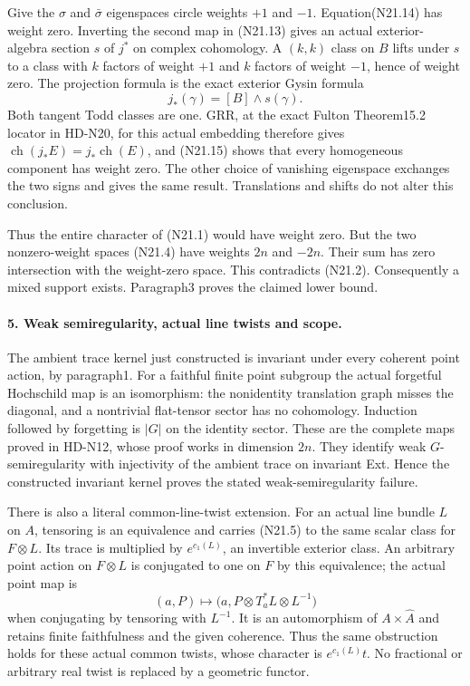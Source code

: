 Give the $\sigma$ and $\bar\sigma$ eigenspaces circle weights
$+1$ and $-1$. Equation(N21.14) has weight zero. Inverting
the second map in (N21.13) gives an actual exterior-algebra
section $s$ of $j^*$ on complex cohomology. A $(k,k)$ class
on $B$ lifts under $s$ to a class with $k$ factors of weight
$+1$ and $k$ factors of weight $-1$, hence of weight zero.
The projection formula is the exact exterior Gysin formula
\[
                  j_*(\gamma)=[B]\wedge s(\gamma).
                                                               \tag{N21.15}
\]
Both tangent Todd classes are one. GRR, at the exact Fulton
Theorem15.2 locator in HD-N20, for this actual
embedding therefore gives
$\operatorname{ch}(j_*E)=j_*\operatorname{ch}(E)$, and
(N21.15) shows that every homogeneous component has
weight zero. The other choice of vanishing eigenspace
exchanges the two signs and gives the same result.
Translations and shifts do not alter this conclusion.

Thus the entire character of (N21.1) would have weight
zero. But the two nonzero-weight spaces (N21.4) have
weights $2n$ and $-2n$. Their sum has zero intersection
with the weight-zero space. This contradicts (N21.2).
Consequently a mixed support exists. Paragraph3 proves
the claimed lower bound.

\paragraph{5. Weak semiregularity, actual line twists and scope.}
The ambient trace kernel just constructed is invariant
under every coherent point action, by paragraph1. For a
faithful finite point subgroup the actual forgetful
Hochschild map is an isomorphism: the nonidentity
translation graph misses the diagonal, and a nontrivial
flat-tensor sector has no cohomology. Induction followed
by forgetting is $|G|$ on the identity sector. These are
the complete maps proved in HD-N12, whose proof works
in dimension $2n$. They identify weak $G$-semiregularity
with injectivity of the ambient trace on invariant Ext.
Hence the constructed invariant kernel proves the
stated weak-semiregularity failure.

There is also a literal common-line-twist extension.
For an actual line bundle $L$ on $A$, tensoring is an
equivalence and carries (N21.5) to the same scalar class
for $F\otimes L$. Its trace is multiplied by
$e^{c_1(L)}$, an invertible exterior class. An arbitrary
point action on $F\otimes L$ is conjugated to one on
$F$ by this equivalence; the actual point map is
\[
 (a,P)\longmapsto
       \bigl(a,P\otimes T_a^*L\otimes L^{-1}\bigr)
                                                               \tag{N21.16}
\]
when conjugating by tensoring with $L^{-1}$.
It is an automorphism of $A\times\widehat A$ and retains
finite faithfulness and the given coherence. Thus the
same obstruction holds for these actual common twists,
whose character is $e^{c_1(L)}t$. No fractional or
arbitrary real twist is replaced by a geometric functor.

